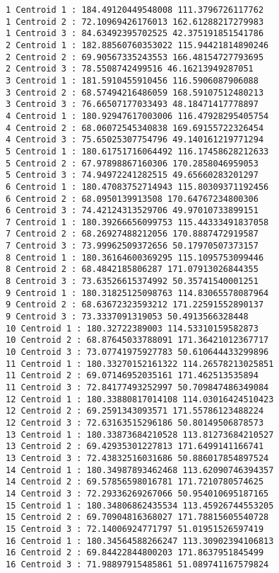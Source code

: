 \documentclass[11pt]{article}
\begin{document}
    \begin{Verbatim}[commandchars=\\\{\}]
1 Centroid 1 : 184.49120449548008 111.3796726117762
1 Centroid 2 : 72.10969426176013 162.61288217279983
1 Centroid 3 : 84.63492395702525 42.375191851541786
2 Centroid 1 : 182.88560760353022 115.94421814890246
2 Centroid 2 : 69.90567335243553 166.48154727793695
2 Centroid 3 : 78.5508742499516 46.16213949287051
3 Centroid 1 : 181.5910455910456 116.5906087906088
3 Centroid 2 : 68.57494216486059 168.59107512480213
3 Centroid 3 : 76.66507177033493 48.18471417778897
4 Centroid 1 : 180.92947617003006 116.47928295405754
4 Centroid 2 : 68.06072545340838 169.69155722326454
4 Centroid 3 : 75.65025307754796 49.140161219771294
5 Centroid 1 : 180.61751716064492 116.17458628212633
5 Centroid 2 : 67.97898867160306 170.2858046959053
5 Centroid 3 : 74.94972241282515 49.65660283201297
6 Centroid 1 : 180.47083752714943 115.80309371192456
6 Centroid 2 : 68.0950139913508 170.64767234800306
6 Centroid 3 : 74.42124313529706 49.97010733899151
7 Centroid 1 : 180.39266656099753 115.44333491837058
7 Centroid 2 : 68.26927488212056 170.8887472919587
7 Centroid 3 : 73.99962509372656 50.17970507373157
8 Centroid 1 : 180.36164600369295 115.1095753099446
8 Centroid 2 : 68.4842185806287 171.07913026844355
8 Centroid 3 : 73.63526615374992 50.35741540001251
9 Centroid 1 : 180.31825125098763 114.83065578087964
9 Centroid 2 : 68.63672323593212 171.22591552890137
9 Centroid 3 : 73.3337091319053 50.4913566328448
10 Centroid 1 : 180.32722389003 114.53310159582873
10 Centroid 2 : 68.87645033788091 171.36421012367717
10 Centroid 3 : 73.07741975927783 50.610644433299896
11 Centroid 1 : 180.33270152161322 114.26578213025851
11 Centroid 2 : 69.07146952035161 171.462513535894
11 Centroid 3 : 72.84177493252997 50.709847486349084
12 Centroid 1 : 180.33880817014108 114.03016424510423
12 Centroid 2 : 69.2591343093571 171.55786123488224
12 Centroid 3 : 72.63163515296186 50.80149506878573
13 Centroid 1 : 180.33873684210528 113.81273684210527
13 Centroid 2 : 69.42935301227813 171.6499141166741
13 Centroid 3 : 72.43832516031686 50.886017854897524
14 Centroid 1 : 180.34987893462468 113.62090746394357
14 Centroid 2 : 69.57856598016781 171.7210780574625
14 Centroid 3 : 72.29336269267066 50.954010695187165
15 Centroid 1 : 180.34806862435534 113.45926744553205
15 Centroid 2 : 69.70904816368027 171.78815605540728
15 Centroid 3 : 72.14006924771797 51.01951526597419
16 Centroid 1 : 180.34564588266247 113.30902394106813
16 Centroid 2 : 69.84422844800203 171.8637951845499
16 Centroid 3 : 71.98897915485861 51.089741167579824

\end{Verbatim}
\end{document}
